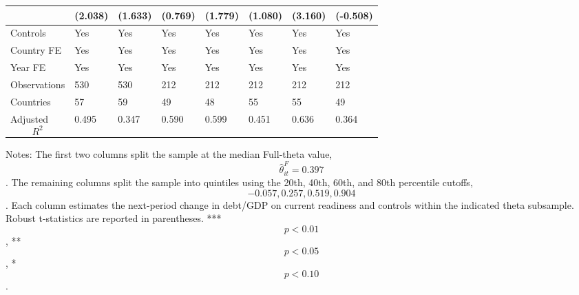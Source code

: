 \begin{table}[H]
\begin{threeparttable}
\begin{tabularx}{\textwidth}{lYYYYYYY}
  & (2.038) & (1.633) & (0.769) & (1.779) & (1.080) & (3.160) & (-0.508) \\
\midrule
Controls & Yes & Yes & Yes & Yes & Yes & Yes & Yes \\
Country FE & Yes & Yes & Yes & Yes & Yes & Yes & Yes \\
Year FE & Yes & Yes & Yes & Yes & Yes & Yes & Yes \\
Observations & 530 & 530 & 212 & 212 & 212 & 212 & 212 \\
Countries & 57 & 59 & 49 & 48 & 55 & 55 & 49 \\
Adjusted $$R^2$$ & 0.495 & 0.347 & 0.590 & 0.599 & 0.451 & 0.636 & 0.364 \\
\bottomrule
\end{tabularx}
\begin{tablenotes}[flushleft]\footnotesize
\item Notes: The first two columns split the sample at the median Full-theta value, $$\widehat{\theta}^{F}_{it}=0.397$$. The remaining columns split the sample into quintiles using the 20th, 40th, 60th, and 80th percentile cutoffs, $$-0.057, 0.257, 0.519, 0.904$$. Each column estimates the next-period change in debt/GDP on current readiness and controls within the indicated theta subsample. Robust t-statistics are reported in parentheses. *** $$p<0.01$$, ** $$p<0.05$$, * $$p<0.10$$.
\end{tablenotes}
\end{threeparttable}
\end{table}
